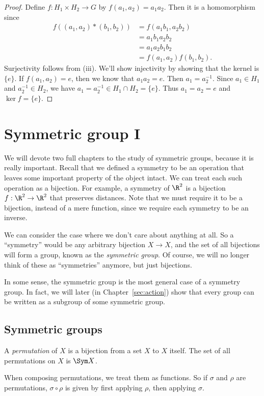 \documentclass[a4paper]{article}
\begin{document}
\begin{proof}
  Define $f:H_1\times H_2\rightarrow G$ by $f(a_1, a_2) = a_1a_2$. Then it is a homomorphism since
  \begin{align*}
    f((a_1, a_2)*(b_1,b_2)) &= f(a_1b_1, a_2b_2)\\
    &= a_1b_1a_2b_2\\
    &= a_1a_2b_1b_2\\
    &= f(a_1, a_2)f(b_1,b_2).
  \end{align*}
  Surjectivity follows from (iii). We'll show injectivity by showing that the kernel is $\{e\}$. If $f(a_1, a_2)=e$, then we know that $a_1a_2 = e$. Then $a_1=a_2^{-1}$. Since $a_1 \in H_1$ and $a_2^{-1} \in H_2$, we have $a_1 = a_2^{-1} \in H_1\cap H_2 = \{e\}$. Thus $a_1 = a_2 = e$ and $\ker f = \{e\}$.
\end{proof}

\section{Symmetric group I}
We will devote two full chapters to the study of symmetric groups, because it is really important. Recall that we defined a symmetry to be an operation that leaves some important property of the object intact. We can treat each such operation as a bijection. For example, a symmetry of $\R^2$ is a bijection $f: \R^2 \to \R^2$ that preserves distances. Note that we must require it to be a bijection, instead of a mere function, since we require each symmetry to be an inverse.

We can consider the case where we don't care about anything at all. So a ``symmetry'' would be any arbitrary bijection $X \to X$, and the set of all bijections will form a group, known as the \emph{symmetric group}. Of course, we will no longer think of these as ``symmetries'' anymore, but just bijections.

In some sense, the symmetric group is the most general case of a symmetry group. In fact, we will later (in Chapter~\ref{sec:action}) show that every group can be written as a subgroup of some symmetric group.
\subsection{Symmetric groups}
\begin{defi}[Permutation]
  A \emph{permutation} of $X$ is a bijection from a set $X$ to $X$ itself. The set of all permutations on $X$ is $\Sym X$.
\end{defi}
When composing permutations, we treat them as functions. So if $\sigma$ and $\rho$ are permutations, $\sigma\circ \rho$ is given by first applying $\rho$, then applying $\sigma$.
\end{document}
